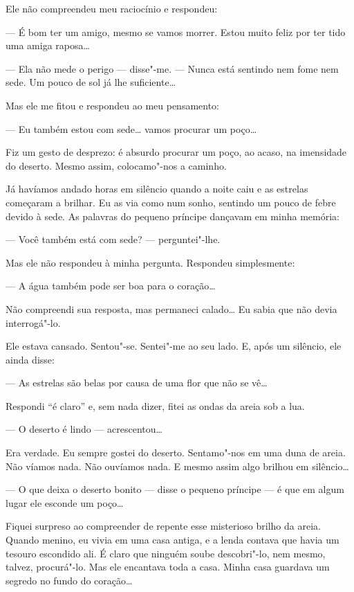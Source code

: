 \begin{Parallel}[p]{}{}
{Ele não compreendeu meu raciocínio e respondeu:

--- É bom ter um amigo, mesmo se vamos morrer. Estou muito feliz por ter
tido uma amiga raposa\ldots{}

--- Ela não mede o perigo --- disse"-me. --- Nunca está sentindo nem fome nem
sede. Um pouco de sol já lhe suficiente\ldots{}

Mas ele me fitou e respondeu ao meu pensamento:

--- Eu também estou com sede\ldots{} vamos procurar um poço\ldots{}

Fiz um gesto de desprezo: é absurdo procurar um poço, ao acaso, na
imensidade do deserto. Mesmo assim, colocamo"-nos a caminho.

Já havíamos andado horas em silêncio quando a noite caiu e as estrelas
começaram a brilhar. Eu as via como num sonho, sentindo um pouco de
febre devido à sede. As palavras do pequeno príncipe dançavam em minha
memória:

--- Você também está com sede? --- perguntei"-lhe.

Mas ele não respondeu à minha pergunta. Respondeu simplesmente:

--- A água também pode ser boa para o coração\ldots{}

Não compreendi sua resposta, mas permaneci calado\ldots{} Eu sabia que não
devia interrogá"-lo.

Ele estava cansado. Sentou"-se. Sentei"-me ao seu lado. E, após um
silêncio, ele ainda disse:

--- As estrelas são belas por causa de uma flor que não se vê\ldots{}

Respondi ``é claro'' e, sem nada dizer, fitei as ondas da areia sob a
lua.

--- O deserto é lindo --- acrescentou\ldots{}

Era verdade. Eu sempre gostei do deserto. Sentamo"-nos em uma duna de
areia. Não víamos nada. Não ouvíamos nada. E mesmo assim algo brilhou em
silêncio\ldots{}

--- O que deixa o deserto bonito --- disse o pequeno príncipe --- é que em
algum lugar ele esconde um poço\ldots{}

Fiquei surpreso ao compreender de repente esse misterioso brilho da
areia. Quando menino, eu vivia em uma casa antiga, e a lenda contava que
havia um tesouro escondido ali. É claro que ninguém soube descobri"-lo,
nem mesmo, talvez, procurá"-lo. Mas ele encantava toda a casa. Minha casa
guardava um segredo no fundo do coração\ldots{}

}
\end{Parallel}
